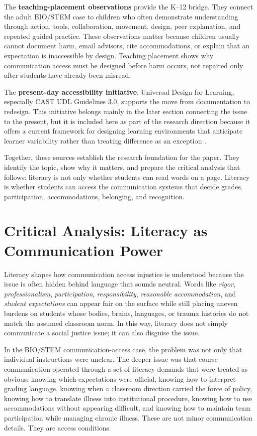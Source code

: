 \documentclass[12pt]{article}
\begin{document}
The \textbf{teaching-placement observations} provide the K--12 bridge. They connect the adult BIO/STEM case to children who often demonstrate understanding through action, tools, collaboration, movement, design, peer explanation, and repeated guided practice. These observations matter because children usually cannot document harm, email advisors, cite accommodations, or explain that an expectation is inaccessible by design. Teaching placement shows why communication access must be designed before harm occurs, not repaired only after students have already been misread.

The \textbf{present-day accessibility initiative}, Universal Design for Learning, especially CAST UDL Guidelines 3.0, supports the move from documentation to redesign. This initiative belongs mainly in the later section connecting the issue to the present, but it is included here as part of the research direction because it offers a current framework for designing learning environments that anticipate learner variability rather than treating difference as an exception \citep{cast2024udl}.

Together, these sources establish the research foundation for the paper. They identify the topic, show why it matters, and prepare the critical analysis that follows: literacy is not only whether students can read words on a page. Literacy is whether students can access the communication systems that decide grades, participation, accommodations, belonging, and recognition.

\section*{Critical Analysis: Literacy as Communication Power}

Literacy shapes how communication access injustice is understood because the issue is often hidden behind language that sounds neutral. Words like \textit{rigor}, \textit{professionalism}, \textit{participation}, \textit{responsibility}, \textit{reasonable accommodation}, and \textit{student expectations} can appear fair on the surface while still placing uneven burdens on students whose bodies, brains, languages, or trauma histories do not match the assumed classroom norm. In this way, literacy does not simply communicate a social justice issue; it can also disguise the issue.

In the BIO/STEM communication-access case, the problem was not only that individual instructions were unclear. The deeper issue was that course communication operated through a set of literacy demands that were treated as obvious: knowing which expectations were official, knowing how to interpret grading language, knowing when a classroom direction carried the force of policy, knowing how to translate illness into institutional procedure, knowing how to use accommodations without appearing difficult, and knowing how to maintain team participation while managing chronic illness. These are not minor communication details. They are access conditions.
\end{document}
